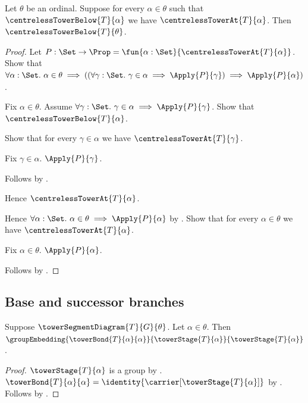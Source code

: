 \begin{theorem}\label{centreless_tower_bounded_induction}
    Let $\theta$ be an ordinal.
    Suppose for every $\alpha\in\theta$ such that
        $\centrelessTowerBelow{T}{\alpha}$ we have
        $\centrelessTowerAt{T}{\alpha}$.
    Then $\centrelessTowerBelow{T}{\theta}$.
\end{theorem}
\begin{proof}
    Let $P:\Set\to\Prop=\fun{\alpha:\Set}{
        \centrelessTowerAt{T}{\alpha}}$.
    Show that $\forall \alpha:\Set.\ \alpha\in\theta\implies
        ((\forall \gamma:\Set.\ \gamma\in\alpha\implies
            \Apply{P}{\gamma})
        \implies\Apply{P}{\alpha})$.
    \begin{subproof}
        Fix $\alpha\in\theta$.
        Assume $\forall \gamma:\Set.\ \gamma\in\alpha\implies
            \Apply{P}{\gamma}$.
        Show that $\centrelessTowerBelow{T}{\alpha}$.
        \begin{subproof}
            Show that for every $\gamma\in\alpha$ we have
                $\centrelessTowerAt{T}{\gamma}$.
            \begin{subproof}
                Fix $\gamma\in\alpha$.
                $\Apply{P}{\gamma}$.
            \end{subproof}
            Follows by .
        \end{subproof}
        Hence $\centrelessTowerAt{T}{\alpha}$.
    \end{subproof}
    Hence $\forall \alpha:\Set.\ \alpha\in\theta\implies
        \Apply{P}{\alpha}$ by
        .
    Show that for every $\alpha\in\theta$ we have
        $\centrelessTowerAt{T}{\alpha}$.
    \begin{subproof}
        Fix $\alpha\in\theta$.
        $\Apply{P}{\alpha}$.
    \end{subproof}
    Follows by .
\end{proof}

\subsection{Base and successor branches}

\begin{proposition}\label{tower_self_bond_embedding}
    Suppose $\towerSegmentDiagram{T}{G}{\theta}$.
    Let $\alpha\in\theta$.
    Then $\groupEmbedding
        {\towerBond{T}{\alpha}{\alpha}}
        {\towerStage{T}{\alpha}}
        {\towerStage{T}{\alpha}}$.
\end{proposition}
\begin{proof}
    $\towerStage{T}{\alpha}$ is a group by
        .
    $\towerBond{T}{\alpha}{\alpha}=
        \identity{\carrier[\towerStage{T}{\alpha}]}$ by
        .
    Follows by .
\end{proof}

